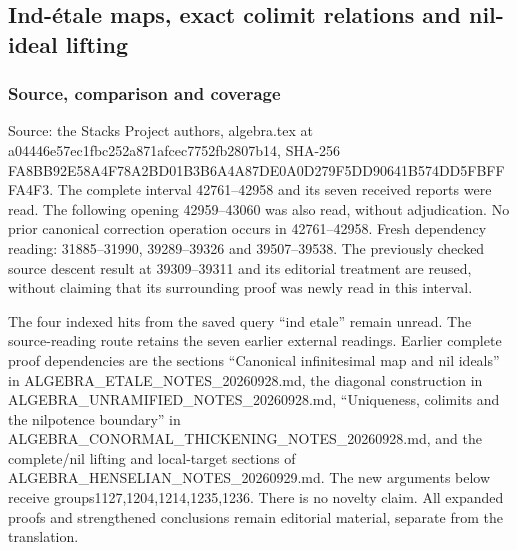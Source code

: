 \subsection{Ind-étale maps, exact colimit relations and nil-ideal lifting}\label{algebra-proof-059-ind-uxe9tale-maps-exact-colimit-relations-and-nil-ideal-lifting}

\subsubsection{Source, comparison and coverage}\label{algebra-proof-059-source-comparison-and-coverage}

Source: the Stacks Project authors, algebra.tex at a044\allowbreak{}46e5\allowbreak{}7ec1\allowbreak{}fbc2\allowbreak{}52a8\allowbreak{}71af\allowbreak{}cec7\allowbreak{}752f\allowbreak{}b280\allowbreak{}7b14, SHA-256 FA8B\allowbreak{}B92E\allowbreak{}58A4\allowbreak{}F78A\allowbreak{}2BD0\allowbreak{}1B3B\allowbreak{}6A4A\allowbreak{}87DE\allowbreak{}0A0D\allowbreak{}279F\allowbreak{}5DD9\allowbreak{}0641\allowbreak{}B574\allowbreak{}DD5F\allowbreak{}BFFF\allowbreak{}A4F3. The complete interval 42761--42958 and its seven received reports were read. The following opening 42959--43060 was also read, without adjudication. No prior canonical correction operation occurs in 42761--42958. Fresh dependency reading: 31885--31990, 39289--39326 and 39507--39538. The previously checked source descent result at 39309--39311 and its editorial treatment are reused, without claiming that its surrounding proof was newly read in this interval.

The four indexed hits from the saved query ``ind etale'' remain unread. The source-reading route retains the seven earlier external readings. Earlier complete proof dependencies are the sections ``Canonical infinitesimal map and nil ideals'' in ALGEBRA\_\allowbreak{}ETALE\_\allowbreak{}NOTES\_\allowbreak{}20260928.\allowbreak{}md, the diagonal construction in ALGEBRA\_\allowbreak{}UNRAMIFIED\_\allowbreak{}NOTES\_\allowbreak{}20260928.\allowbreak{}md, ``Uniqueness, colimits and the nilpotence boundary'' in ALGEBRA\_\allowbreak{}CONORMAL\_\allowbreak{}THICKENING\_\allowbreak{}NOTES\_\allowbreak{}20260928.\allowbreak{}md, and the complete/nil lifting and local-target sections of ALGEBRA\_\allowbreak{}HENSELIAN\_\allowbreak{}NOTES\_\allowbreak{}20260929.\allowbreak{}md. The new arguments below receive groups1127,1204,1214,1235,1236. There is no novelty claim. All expanded proofs and strengthened conclusions remain editorial material, separate from the translation.

